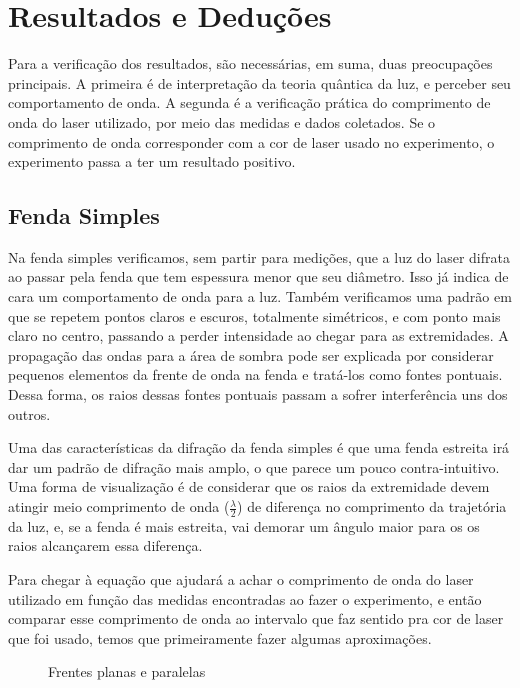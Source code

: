 \section{Resultados e Deduções}\label{result}

Para a verificação dos resultados, são necessárias, em suma, duas preocupações principais. A primeira é de interpretação da teoria quântica da luz, e perceber seu comportamento de onda. A segunda é a verificação prática do comprimento de onda do laser utilizado, por meio das medidas e dados coletados. Se o comprimento de onda corresponder com a cor de laser usado no experimento, o experimento passa a ter um resultado positivo.

\subsection{Fenda Simples}\label{fenda_simples}

Na fenda simples verificamos, sem partir para medições, que a luz do laser difrata ao passar pela fenda que tem espessura menor que seu diâmetro. Isso já indica de cara um comportamento de onda para a luz. Também verificamos uma padrão em que se repetem pontos claros e escuros, totalmente simétricos, e com ponto mais claro no centro, passando a perder intensidade ao chegar para as extremidades. A propagação das ondas para a área de sombra pode ser explicada por considerar pequenos elementos da frente de onda na fenda e tratá-los como fontes pontuais. Dessa forma, os raios dessas fontes pontuais passam a sofrer interferência uns dos outros.

Uma das características da difração da fenda simples é que uma fenda estreita irá dar um padrão de difração mais amplo, o que parece um pouco contra-intuitivo. Uma forma de visualização é de considerar que os raios da extremidade devem atingir meio comprimento de onda ($\frac{\lambda}{2}$) de diferença no comprimento da trajetória da luz, e, se a fenda é mais estreita, vai demorar um ângulo maior para os os raios alcançarem essa diferença.

Para chegar à equação que ajudará a achar o comprimento de onda do laser utilizado em função das medidas encontradas ao fazer o experimento, e então comparar esse comprimento de onda ao intervalo que faz sentido pra cor de laser que foi usado, temos que primeiramente fazer algumas aproximações.

\begin{figure}[H]
\begin{center}
\end{center}
\caption{Frentes planas e paralelas}
\label{frentes}
\end{figure}

